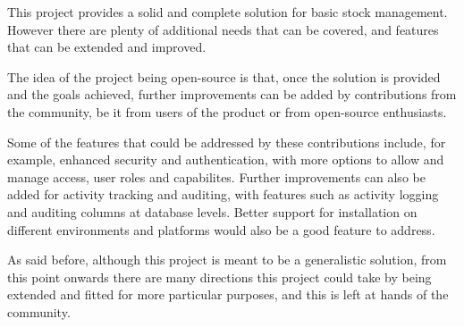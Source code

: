 This project provides a solid and complete solution for basic stock management. However there are plenty of additional needs that can be covered, and features that can be extended and improved.

The idea of the project being open-source is that, once the solution is provided and the goals achieved, further improvements can be added by contributions from the community, be it from users of the product or from open-source enthusiasts.

Some of the features that could be addressed by these contributions include, for example, enhanced security and authentication, with more options to allow and manage access, user roles and capabilites. Further improvements can also be added for activity tracking and auditing, with features such as activity logging and auditing columns at database levels. Better support for installation on different environments and platforms would also be a good feature to address.

As said before, although this project is meant to be a generalistic solution, from this point onwards there are many directions this project could take by being extended and fitted for more particular purposes, and this is left at hands of the community.